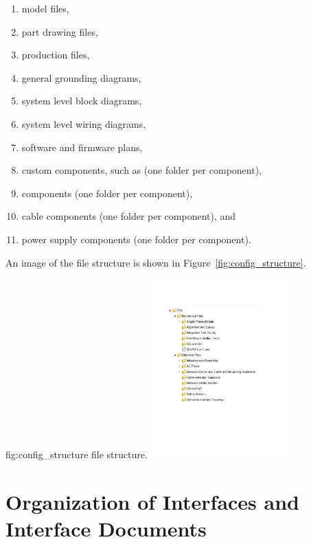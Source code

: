 \begin{enumerate}
 \begin{enumerate}
   \item \threed model files,
   \item \twod part drawing files,
   \item production files,
   \item general grounding diagrams,
   \item system level block diagrams,
   \item system level wiring diagrams,
   \item software and firmware plans,
   \item custom components, such as  (one folder per component),
   \item {} components (one folder per component),
   \item cable components (one folder per component), and 
   \item power supply components (one folder per component).
 \end{enumerate}

\end{enumerate}

An image of the  file structure is shown in
Figure~\ref{fig:config_structure}.
\begin{dunefigure}{fig:config_structure}
  { file structure.}
  \includegraphics[width=0.4\textwidth]{graphics/config_storage_v2}
\end{dunefigure}

\section{Organization of Interfaces and Interface Documents}
\label{sec:fdsp-coord-integ-interface}

